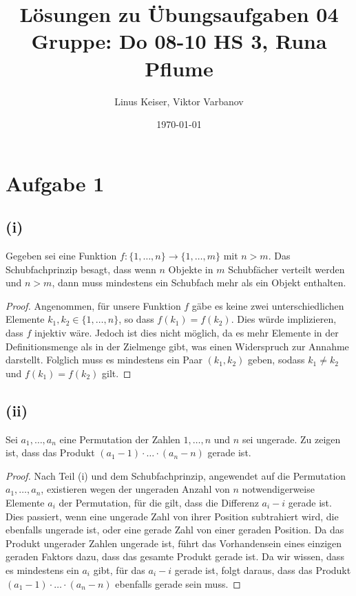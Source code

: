 \documentclass{article}
\title{Lösungen zu Übungsaufgaben 04 \\ \small Gruppe: Do 08-10 HS 3, Runa Pflume}
\author{Linus Keiser, Viktor Varbanov}
\date{\today}
\begin{document}
\maketitle

\section*{Aufgabe 1}

\subsection*{(i)}
Gegeben sei eine Funktion $f: \{1, \ldots, n\} \rightarrow \{1, \ldots, m\}$ mit $n > m$. Das Schubfachprinzip besagt, dass wenn $n$ Objekte in $m$ Schubfächer verteilt werden und $n > m$, dann muss mindestens ein Schubfach mehr als ein Objekt enthalten.

\begin{proof}
	Angenommen, für unsere Funktion $f$ gäbe es keine zwei unterschiedlichen Elemente $k_1, k_2 \in \{1, \ldots, n\}$, so dass $f(k_1) = f(k_2)$. Dies würde implizieren, dass $f$ injektiv wäre. Jedoch ist dies nicht möglich, da es mehr Elemente in der Definitionsmenge als in der Zielmenge gibt, was einen Widerspruch zur Annahme darstellt. Folglich muss es mindestens ein Paar $(k_1, k_2)$ geben, sodass $k_1 \neq k_2$ und $f(k_1) = f(k_2)$ gilt.
\end{proof}

\subsection*{(ii)}
Sei \(a_1, \ldots, a_n\) eine Permutation der Zahlen \(1, \ldots, n\) und \(n\) sei ungerade. Zu zeigen ist, dass das Produkt \((a_1 - 1) \cdot \ldots \cdot (a_n - n)\) gerade ist.

\begin{proof}
	Nach Teil (i) und dem Schubfachprinzip, angewendet auf die Permutation \(a_1, \ldots, a_n\), existieren wegen der ungeraden Anzahl von \(n\) notwendigerweise Elemente \(a_i\) der Permutation, für die gilt, dass die Differenz \(a_i - i\) gerade ist. Dies passiert, wenn eine ungerade Zahl von ihrer Position subtrahiert wird, die ebenfalls ungerade ist, oder eine gerade Zahl von einer geraden Position. Da das Produkt ungerader Zahlen ungerade ist, führt das Vorhandensein eines einzigen geraden Faktors dazu, dass das gesamte Produkt gerade ist. Da wir wissen, dass es mindestens ein \(a_i\) gibt, für das \(a_i - i\) gerade ist, folgt daraus, dass das Produkt \((a_1 - 1) \cdot \ldots \cdot (a_n - n)\) ebenfalls gerade sein muss.
\end{proof}
\end{document}
